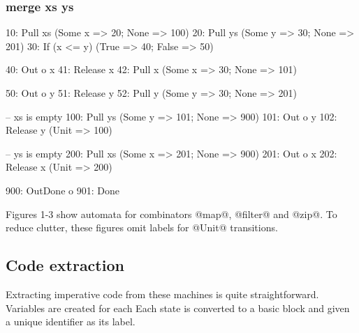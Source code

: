 \subsubsection{merge xs ys}
\begin{code}
10: Pull xs         (Some x => 20; None  => 100)
20: Pull ys         (Some y => 30; None  => 201)
30: If (x <= y)     (True   => 40; False => 50)

40: Out o x
41: Release x
42: Pull x          (Some x => 30; None  => 101)

50: Out o y
51: Release y
52: Pull y          (Some y => 30; None  => 201)

-- xs is empty
100: Pull ys        (Some y => 101; None => 900)
101: Out o y
102: Release y      (Unit   => 100)

-- ys is empty
200: Pull xs        (Some x => 201; None => 900)
201: Out o x
202: Release x      (Unit   => 200)

900: OutDone o
901: Done
\end{code}






Figures 1-3 show automata for combinators @map@, @filter@ and @zip@.
To reduce clutter, these figures omit labels for @Unit@ transitions.






\subsection{Code extraction}

Extracting imperative code from these machines is quite straightforward.
Variables are created for each 
Each state is converted to a basic block and given a unique identifier as its label.


